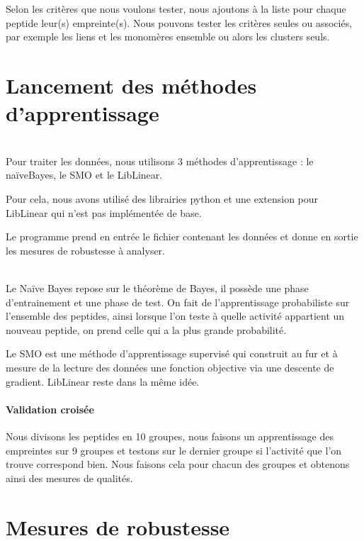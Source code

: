 \documentclass[a4paper,10pt]{report}
\begin{document}
	\paragraph{}
	  ~\\
	  Selon les critères que nous voulons tester, nous ajoutons à la liste pour chaque peptide leur(s) empreinte(s).
	  Nous pouvons tester les critères seules ou associés, par exemple les liens et les monomères ensemble ou alors les clusters seuls.
	  
     \section{Lancement des méthodes d'apprentissage}
	  
	  ~\\
	  Pour traiter les données, nous utilisons 3 méthodes d'apprentissage : le naïveBayes, le SMO et le LibLinear. 
	  
	  Pour cela, nous avons utilisé des librairies python et une extension pour LibLinear qui n'est pas implémentée de base.
	  
	  Le programme prend en entrée le fichier contenant les données et donne en sortie les mesures de robustesse à analyser.
	  
	  
	  ~\\Le Naïve Bayes repose sur le théorème de Bayes, il possède une phase d'entrainement et une phase de test.
	  On fait de l'apprentissage probabiliste sur l'ensemble des peptides, ainsi lorsque l'on teste à quelle activité appartient un nouveau peptide, on prend celle qui a la plus grande probabilité.  
	    
	  Le SMO est une méthode d'apprentissage supervisé qui construit au fur et à mesure de la lecture des données une fonction objective via une descente de gradient.   
	  LibLinear reste dans la même idée.
	      
	  \paragraph{Validation croisée}
	    
	  Nous divisons les peptides en 10 groupes, nous faisons un apprentissage des empreintes sur 9 groupes et testons sur le dernier groupe si l'activité que l'on trouve correspond bien. Nous faisons cela pour chacun des groupes et obtenons ainsi des mesures de qualités.
	    
     \section{Mesures de robustesse}
	  
\end{document}
